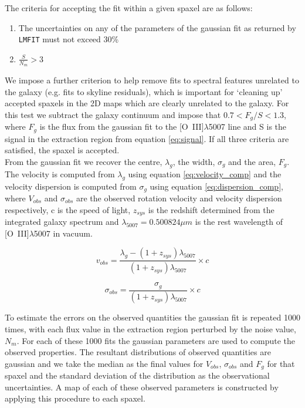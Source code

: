 \documentclass[fleqn,usenatbib]{mn2e}
\begin{document}
The criteria for accepting the fit within a given spaxel are as follows:

\begin{enumerate}
\item The uncertainties on any of the parameters of the gaussian fit as returned by {\tt LMFIT} must not exceed 30\%
\item $\frac{S}{N_{m}} > 3$
\end{enumerate}

We impose a further criterion to help remove fits to spectral features unrelated to the galaxy (e.g. fits to skyline residuals), which is important for `cleaning up' accepted spaxels in the 2D maps which are clearly unrelated to the galaxy. For this test we subtract the galaxy continuum and impose that $0.7 < F_{g}/{S} < 1.3$, where $F_{g}$ is the flux from the gaussian fit to the [O~{\sc III}]$\lambda$5007 line and S is the signal in the extraction region from equation \ref{eq:signal}. If all three criteria are satisfied, the spaxel is accepted. \\

From the gaussian fit we recover the centre, $\lambda_{g}$, the width, $\sigma_{g}$ and the area, $F_{g}$.
The velocity is computed from $\lambda_{g}$ using equation \ref{eq:velocity_comp} and the velocity dispersion is computed from $\sigma_{g}$ using equation \ref{eq:dispersion_comp}, where $V_{obs}$ and $\sigma_{obs}$ are the observed rotation velocity and velocity dispersion respectively, c is the speed of light, $z_{sys}$ is the redshift determined from the integrated galaxy spectrum and $\lambda_{5007} = 0.500824\mu m$ is the rest wavelength of [O~{\sc III}]$\lambda$5007 in vacuum.

\begin{equation}\label{eq:velocity_comp}
   v_{obs} = \frac{\lambda_{g} - (1 + z_{sys})\lambda_{5007}}{(1 + z_{sys})\lambda_{5007}} \times c
\end{equation}

\begin{equation}\label{eq:dispersion_comp}
   \sigma_{obs} = \frac{\sigma_{g}}{(1 + z_{sys})\lambda_{5007}} \times c
\end{equation}

To estimate the errors on the observed quantities the gaussian fit is repeated 1000 times, with each flux value in the extraction region perturbed by the noise value, $N_{m}$.
For each of these 1000 fits the gaussian parameters are used to compute the observed properties.
The resultant distributions of observed quantities are gaussian and we take the median as the final values for $V_{obs}$, $\sigma_{obs}$ and $F_{g}$ for that spaxel and the standard deviation of the distribution as the observational uncertainties.
A map of each of these observed parameters is constructed by applying this procedure to each spaxel. \\
\end{document}

